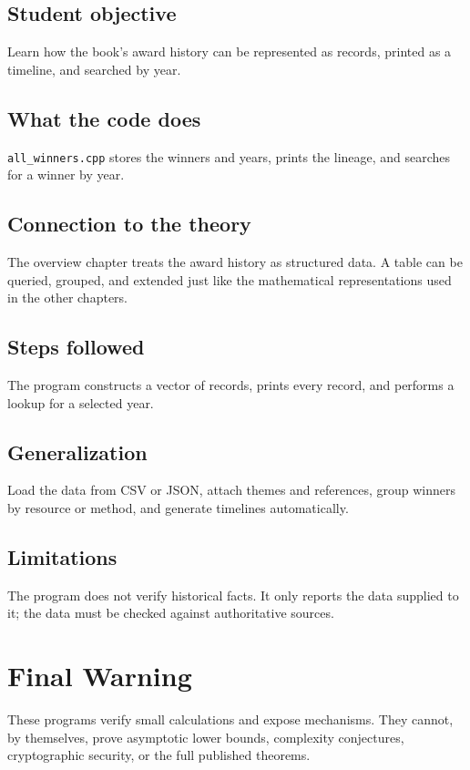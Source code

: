 \documentclass[11pt]{book}
\begin{document}
\section{Student objective}
Learn how the book's award history can be represented as records, printed as a timeline, and searched by year.
\section{What the code does}
\texttt{all\_winners.cpp} stores the winners and years, prints the lineage, and searches for a winner by year.

\section{Connection to the theory}
The overview chapter treats the award history as structured data. A table can be queried, grouped, and extended just like the mathematical representations used in the other chapters.

\section{Steps followed}
The program constructs a vector of records, prints every record, and performs a lookup for a selected year.

\section{Generalization}
Load the data from CSV or JSON, attach themes and references, group winners by resource or method, and generate timelines automatically.

\section{Limitations}
The program does not verify historical facts. It only reports the data supplied to it; the data must be checked against authoritative sources.

\chapter*{Final Warning}
These programs verify small calculations and expose mechanisms. They cannot, by themselves, prove asymptotic lower bounds, complexity conjectures, cryptographic security, or the full published theorems.
\end{document}
